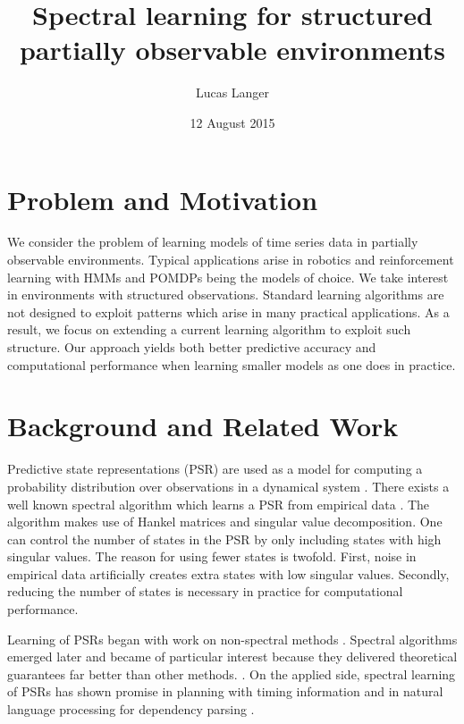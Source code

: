 \documentclass{acm_proc_article-sp}
\begin{document}
\title{Spectral learning for structured partially observable environments}


\author{
\alignauthor
Lucas Langer\\
}

\date{12 August 2015}

\maketitle

\section{Problem and Motivation}

We consider the problem of learning models of time series data in partially observable environments. Typical applications arise in robotics and reinforcement learning with HMMs and POMDPs being the models of choice. We take  interest in environments with structured observations. Standard learning algorithms are not designed to exploit patterns which arise in many practical applications. As a result, we focus on extending a current learning algorithm to exploit such structure. Our approach yields both better predictive accuracy and computational performance when learning smaller models as one does in practice. 

\section{Background and Related Work}

Predictive state representations (PSR) are used as a model for computing a probability distribution over observations in a dynamical system \cite{littman2001predictive}. There exists a well known spectral algorithm which learns a PSR from empirical data \cite{boots2010closing}. The algorithm makes use of Hankel matrices and singular value decomposition. One can control the number of states in the PSR by only including states with high singular values. The reason for using fewer states is twofold. First, noise in empirical data artificially creates extra states with low singular values. Secondly, reducing the number of states is necessary in practice for computational performance. 

Learning of PSRs began with work on non-spectral methods \cite{DBLP:conf/icml/Wiewiora05}. Spectral algorithms emerged later and became of particular interest because they delivered theoretical guarantees far better than other methods. \cite{boots2010closing}. On the applied side, spectral learning of PSRs has shown promise in planning with timing information \cite{pierrelucplanning2015} and in natural language processing for dependency parsing \cite{balle2013spectral}.
\end{document}
